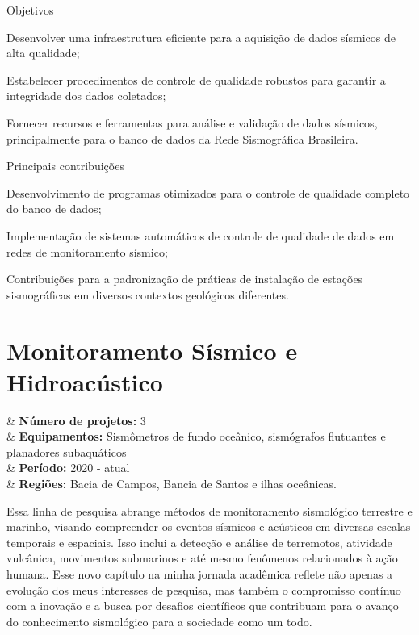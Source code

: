 \documentclass[10pt,a4paper,oneside]{book}
\begin{document}
\begin{fancyenum}{\faFutbol}{Objetivos}
  \item Desenvolver uma infraestrutura eficiente para a aquisição de dados sísmicos de alta qualidade;
  \item Estabelecer procedimentos de controle de qualidade robustos para garantir a integridade dos dados coletados;
  \item Fornecer recursos e ferramentas para análise e validação de dados sísmicos, principalmente para o banco de dados da Rede Sismográfica Brasileira.
\end{fancyenum}

\begin{fancyenum}{\faCogs}{Principais contribuições}
  \item Desenvolvimento de programas otimizados para o controle de qualidade completo do banco de dados;
  \item Implementação de sistemas automáticos de controle de qualidade de dados em redes de monitoramento sísmico;
  \item Contribuições para a padronização de práticas de instalação de estações sismográficas em diversos contextos geológicos diferentes.
\end{fancyenum}

\section{Monitoramento Sísmico e Hidroacústico}
\label{sec_monitor_sis}

\begin{summarybox}[frametitle=\faProjectDiagram{}\quad Panorama da linha de pesquisa]
	\begin{datelist}
		\faFile* & \textbf{Número de projetos:} 3 \\
		\faBinoculars & \textbf{Equipamentos:} Sismômetros de fundo oceânico, sismógrafos flutuantes e planadores subaquáticos \\
		\faCalendar*[regular] & \textbf{Período:} 2020 - atual \\
		\faMapMarked* & \textbf{Regiões:} Bacia de Campos, Bancia de Santos e ilhas oceânicas. \\
	\end{datelist}
\end{summarybox}

\bigskip

Essa linha de pesquisa abrange métodos de monitoramento sismológico terrestre e marinho, visando compreender os eventos sísmicos e acústicos em diversas escalas temporais e espaciais. Isso inclui a detecção e análise de terremotos, atividade vulcânica, movimentos submarinos e até mesmo fenômenos relacionados à ação humana. Esse novo capítulo na minha jornada acadêmica reflete não apenas a evolução dos meus interesses de pesquisa, mas também o compromisso contínuo com a inovação e a busca por desafios científicos que contribuam para o avanço do conhecimento sismológico para a sociedade como um todo.
\end{document}
